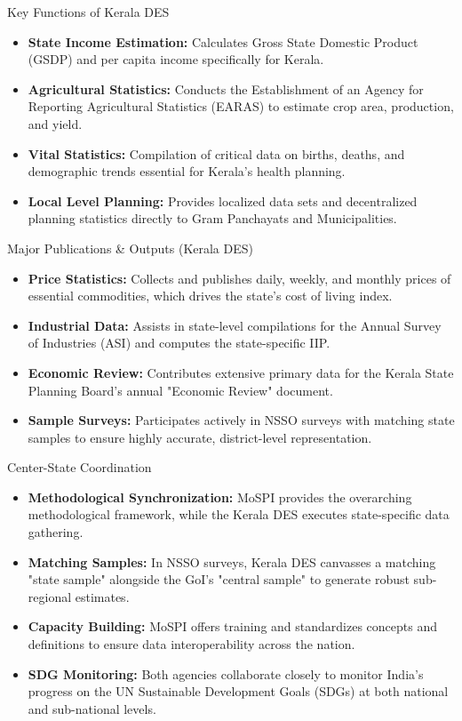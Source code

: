 \documentclass[aspectratio=169]{beamer}
\begin{document}
\begin{frame}{Key Functions of Kerala DES}
    \begin{itemize}
        \item \textbf{State Income Estimation:} Calculates Gross State Domestic Product (GSDP) and per capita income specifically for Kerala.
        \item \textbf{Agricultural Statistics:} Conducts the Establishment of an Agency for Reporting Agricultural Statistics (EARAS) to estimate crop area, production, and yield.
        \item \textbf{Vital Statistics:} Compilation of critical data on births, deaths, and demographic trends essential for Kerala's health planning.
        \item \textbf{Local Level Planning:} Provides localized data sets and decentralized planning statistics directly to Gram Panchayats and Municipalities.
    \end{itemize}
\end{frame}

\begin{frame}{Major Publications \& Outputs (Kerala DES)}
    \begin{itemize}
        \item \textbf{Price Statistics:} Collects and publishes daily, weekly, and monthly prices of essential commodities, which drives the state's cost of living index.
        \item \textbf{Industrial Data:} Assists in state-level compilations for the Annual Survey of Industries (ASI) and computes the state-specific IIP.
        \item \textbf{Economic Review:} Contributes extensive primary data for the Kerala State Planning Board's annual "Economic Review" document.
        \item \textbf{Sample Surveys:} Participates actively in NSSO surveys with matching state samples to ensure highly accurate, district-level representation.
    \end{itemize}
\end{frame}

\begin{frame}{Center-State Coordination}
    \begin{itemize}
        \item \textbf{Methodological Synchronization:} MoSPI provides the overarching methodological framework, while the Kerala DES executes state-specific data gathering.
        \item \textbf{Matching Samples:} In NSSO surveys, Kerala DES canvasses a matching "state sample" alongside the GoI's "central sample" to generate robust sub-regional estimates.
        \item \textbf{Capacity Building:} MoSPI offers training and standardizes concepts and definitions to ensure data interoperability across the nation.
        \item \textbf{SDG Monitoring:} Both agencies collaborate closely to monitor India's progress on the UN Sustainable Development Goals (SDGs) at both national and sub-national levels.
    \end{itemize}
\end{frame}
\end{document}
